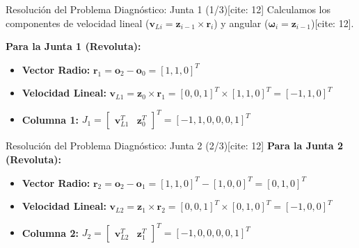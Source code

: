 \documentclass[aspectratio=169, xcolor={table,xcdraw}]{beamer}
\begin{document}
\begin{frame}{Resolución del Problema Diagnóstico: Junta 1 (1/3)[cite: 12]}
    Calculamos los componentes de velocidad lineal ($\mathbf{v}_{Li} = \mathbf{z}_{i-1} \times \mathbf{r}_i$) y angular ($\boldsymbol{\omega}_i = \mathbf{z}_{i-1}$)[cite: 12].

    \vfill
    \textbf{Para la Junta 1 (Revoluta):}
    \begin{itemize}
        \item \textbf{Vector Radio:} $\mathbf{r}_1 = \mathbf{o}_2 - \mathbf{o}_0 = [1, 1, 0]^T$
        \item \textbf{Velocidad Lineal:} $\mathbf{v}_{L1} = \mathbf{z}_0 \times \mathbf{r}_1 = [0, 0, 1]^T \times [1, 1, 0]^T = [-1, 1, 0]^T$
        \item \textbf{Columna 1:} $J_1 = \begin{bmatrix} \mathbf{v}_{L1}^T & \mathbf{z}_0^T \end{bmatrix}^T = [-1, 1, 0, 0, 0, 1]^T$
    \end{itemize}
    \vfill
\end{frame}

\begin{frame}{Resolución del Problema Diagnóstico: Junta 2 (2/3)[cite: 12]}
    \textbf{Para la Junta 2 (Revoluta):}

    \vfill
    \begin{itemize}
        \item \textbf{Vector Radio:} $\mathbf{r}_2 = \mathbf{o}_2 - \mathbf{o}_1 = [1, 1, 0]^T - [1, 0, 0]^T = [0, 1, 0]^T$
        \item \textbf{Velocidad Lineal:} $\mathbf{v}_{L2} = \mathbf{z}_1 \times \mathbf{r}_2 = [0, 0, 1]^T \times [0, 1, 0]^T = [-1, 0, 0]^T$
        \item \textbf{Columna 2:} $J_2 = \begin{bmatrix} \mathbf{v}_{L2}^T & \mathbf{z}_1^T \end{bmatrix}^T = [-1, 0, 0, 0, 0, 1]^T$
    \end{itemize}
    \vfill
\end{frame}
\end{document}
